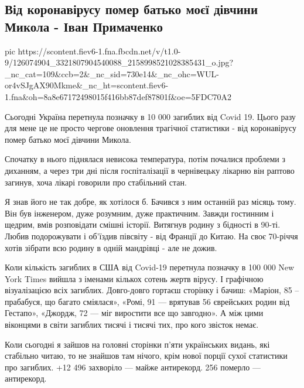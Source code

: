  
 
 

\subsection{Від коронавірусу помер батько моєї дівчини Микола - Іван Примаченко}
\label{sec:18_11_2020.fb.ivan_prymachenko.1.kovid_victims_ua}


\ifcmt
pic https://scontent.fiev6-1.fna.fbcdn.net/v/t1.0-9/126074904_3321807904540088_2158998521028385431_o.jpg?_nc_cat=109&ccb=2&_nc_sid=730e14&_nc_ohc=WUL-or4vSJgAX90Mkme&_nc_ht=scontent.fiev6-1.fna&oh=8a8e67172498015f416bb87def87801f&oe=5FDC70A2
\fi

Сьогодні Україна перетнула позначку в 10 000 загиблих від Covid 19. Цього разу
для мене це не просто чергове оновлення трагічної статистики - від коронавірусу
помер батько моєї дівчини Микола. 

Спочатку в нього піднялася невисока температура, потім почалися проблеми з
диханням, а через три дні після госпіталізації в чернівецьку лікарню він
раптово загинув, хоча лікарі говорили про стабільний стан. 

Я знав його не так добре, як хотілося б. Бачився з ним останній раз місяць
тому. Він був інженером, дуже розумним, дуже практичним. Завжди гостинним і
щедрим, вмів розповідати смішні історії. Витягнув родину з бідності в 90-ті.
Любив подорожувати і об'їздив півсвіту - від Франції до Китаю. На своє 70-річчя
хотів зібрати всю родину в одній мандрівці - але не дожив. 

Коли кількість загиблих в США від Covid-19 перетнула позначку в 100 000 New
York Times вийшла з іменами кількох сотень жертв вірусу. І графічною
візуалізацією всіх загиблих. Довго-довго гортаєш сторінку і бачиш: «Маріон, 85
– прабабуся, що багато сміялася», «Ромі, 91 --- врятував 56 єврейських родин від
Гестапо», «Джордж, 72 --- міг виростити все що завгодно». А між цими віконцями в
світи загиблих тисячі і тисячі тих, про кого звісток немає. 

Коли сьогодні я зайшов на головні сторінки п’яти українських видань, які
стабільно читаю, то не знайшов там нічого, крім нової порції сухої статистики
про загиблих. +12 496 захворіло --- майже антирекорд. 256 померло --- антирекорд. 

